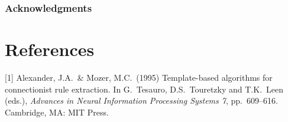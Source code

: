 \documentclass{article}
\begin{document}
\subsubsection*{Acknowledgments}
\section*{References}
\small
[1] Alexander, J.A.\ \& Mozer, M.C.\ (1995) Template-based algorithms
for connectionist rule extraction. In G.\ Tesauro, D.S.\ Touretzky and
T.K.\ Leen (eds.), {\it Advances in Neural Information Processing
  Systems 7}, pp.\ 609--616. Cambridge, MA: MIT Press.
\end{document}
